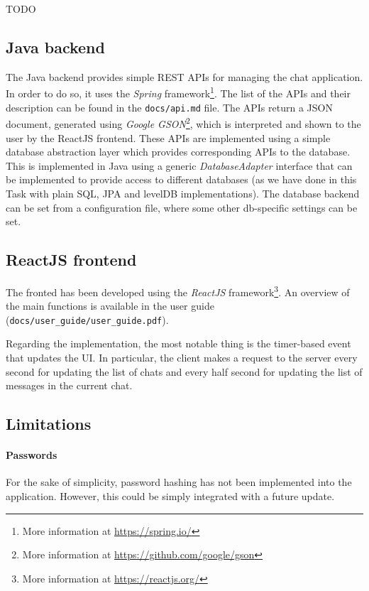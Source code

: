 \documentclass[10pt]{article}
\begin{document}
TODO

\subsection{Java backend}
The Java backend provides simple REST APIs for managing the chat application. 
In order to do so, it uses the \emph{Spring} framework\footnote{More information
at \url{https://spring.io/}}.
The list of the APIs and their description can be found in the 
\texttt{docs/api.md} file. The APIs return a JSON document, generated using
\emph{Google GSON}\footnote{More information at 
\url{https://github.com/google/gson}}, which is interpreted and shown to the user
by the ReactJS frontend.
These APIs are implemented using a simple database abstraction layer which provides 
corresponding APIs to the database. This is implemented in Java 
using a generic \emph{DatabaseAdapter} interface that can be implemented to 
provide access to different databases (as we have done in this Task with plain SQL, 
JPA and levelDB implementations). The database backend can be set from a configuration
file, where some other db-specific settings can be set.

\subsection{ReactJS frontend}
The fronted has been developed using the \emph{ReactJS} framework\footnote{More
information at \url{https://reactjs.org/}}. An overview of the main functions 
is available in the user guide (\texttt{docs/user\_guide/user\_guide.pdf}).

Regarding the implementation, the most notable thing is the timer-based event
that updates the UI. In particular, the client makes a request to the server
every second for updating the list of chats and every half second for updating 
the list of messages in the current chat.

\subsection{Limitations}
\paragraph{Passwords}
For the sake of simplicity, password hashing has not been implemented into the 
application. However, this could be simply integrated with a future update.
\end{document}
